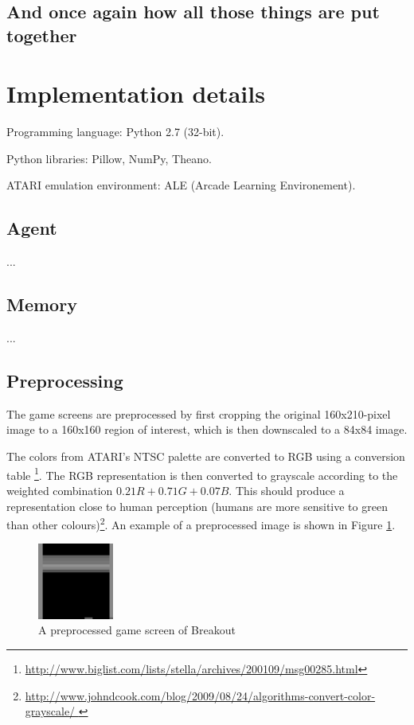 \documentclass[a4paper,12pt]{article}
\begin{document}
\subsection{And once again how all those things are put together}



%
%
\pagebreak
\section{Implementation details}
Programming language: Python 2.7 (32-bit).

Python libraries: Pillow, NumPy, Theano.

ATARI emulation environment: ALE (Arcade Learning Environement).

\subsection{Agent}
...

\subsection{Memory}
...

\subsection{Preprocessing}
\label{subsection_preproc}
The game screens are preprocessed by first cropping the original 160x210-pixel image to a 160x160 region of interest, which is then downscaled to a 84x84 image.

The colors from ATARI's NTSC palette are converted to RGB using a conversion table
\footnote{\url{http://www.biglist.com/lists/stella/archives/200109/msg00285.html}}. The RGB representation is then converted to grayscale according to the weighted combination $0.21R + 0.71G + 0.07B$. This should produce a representation close to human perception (humans are more sensitive to green than other colours)\footnote{\url{http://www.johndcook.com/blog/2009/08/24/algorithms-convert-color-grayscale/
}}. An example of a preprocessed image is shown in Figure \ref{fig:breakoutpreprocessed}.

\begin{figure}[h]
\centering
\includegraphics[width=2.5cm]{fig_preprocessedscreen}
\caption{A preprocessed game screen of Breakout}
\label{fig:breakoutpreprocessed}
\end{figure}
\end{document}

